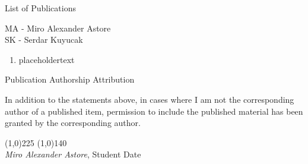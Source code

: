 \newpage

\vspace{3in}

\begin{center}
\begin{Large}
\begin{bfseries}
List of Publications
\end{bfseries}
\end{Large}
\end{center}

\vspace{0.3in}
\hspace{\parindent}MA - Miro Alexander Astore \\
\hspace{\parindent} SK - Serdar Kuyucak \\

\begin{enumerate}
	\item placeholdertext

\end{enumerate}

\newpage
\begin{center}
\begin{Large}
\begin{bfseries}
Publication Authorship Attribution
\end{bfseries}
\end{Large}
\end{center}

\vspace{0.3in}
\noindent In addition to the statements above, in cases where I am not the 
corresponding author of a published item, permission to include the published 
material has been granted by the corresponding author.

\vspace{1.in}


\noindent \line(1,0){225} \hspace{3.0cm} \line(1,0){140} \\
 {\em Miro Alexander Astore}, Student \hspace{6.65cm} Date
 
